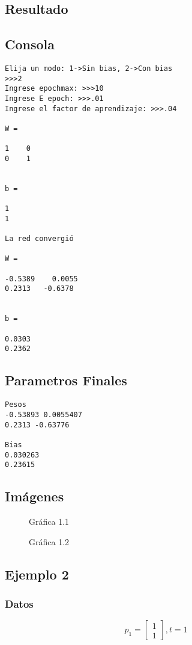 \documentclass{article}
\begin{document}
\subsection{Resultado}
\subsection{Consola}
\begin{lstlisting}
Elija un modo: 1->Sin bias, 2->Con bias
>>>2
Ingrese epochmax: >>>10
Ingrese E epoch: >>>.01
Ingrese el factor de aprendizaje: >>>.04

W =

1    0
0    1


b =

1
1

La red convergió

W =

-0.5389    0.0055
0.2313   -0.6378


b =

0.0303
0.2362
\end{lstlisting}
\subsection{Parametros Finales}
\begin{lstlisting}
Pesos
-0.53893 0.0055407
0.2313 -0.63776

Bias
0.030263
0.23615
\end{lstlisting}
\subsection{Imágenes}
\begin{figure}[htpb]
	\centering
	
	\caption{Gráfica 1.1}
\end{figure}

\begin{figure}[htpb]
	\centering
	
	\caption{Gráfica 1.2}
\end{figure}
\newpage
\subsection{Ejemplo 2}
\subsubsection{Datos}
\[p_1=
\begin{bmatrix}
1\\
1
\end{bmatrix}
,t = 1
\]
\end{document}
